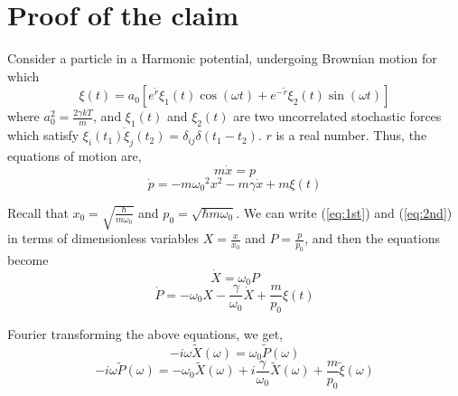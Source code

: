 \documentclass[12pt, twoside]{article}
\begin{document}
\section{Proof of the claim}
Consider a particle in a Harmonic potential, undergoing Brownian motion for which \begin{equation}\label{eq: stochastic}
	\xi(t) =  a_0 [e^{\tilde{r}} \xi_1(t) \cos(\omega t) + e^{-{\tilde{r}}} \xi_2(t)\sin(\omega t)]
\end{equation} where $a_0 ^ 2 = \frac{2 \gamma k T}{m}$, and $\xi_1(t)$ and $\xi_2(t)$ are two uncorrelated stochastic forces which satisfy $\overline{\xi_i(t_1)\xi_j(t_2)} = \delta_{ij}\delta(t_1 - t_2)$. $r$ is a real number. Thus, the equations of motion are, \begin{equation}\label{eq:1st}
m \dot{x} = p
\end{equation}
\begin{equation}\label{eq:2nd}
	\dot{p} = -m{\omega_0}^2 x^2 - m\gamma\dot{x} + m\xi(t)
\end{equation}

Recall that $x_0 =\sqrt{\frac{\hbar}{ m\omega_0}}$ and $p_0 = \sqrt{\hbar m \omega_0}$. We can write (\ref{eq:1st}) and (\ref{eq:2nd}) in terms of dimensionless variables $X = \frac{x}{x_0}$ and $P = \frac{p}{p_0}$, and then the equations become
\begin{equation}\label{eq:1}
	\dot{X} =\omega_0 P
\end{equation}
\begin{equation}\label{eq:2}
	\dot{P} = -\omega_0 X -\frac{\gamma}{\omega_0}\dot{X} + \frac{m}{p_0}\xi(t)
\end{equation}

Fourier transforming the above equations, we get, \begin{equation}\label{eq:1}
-i\omega\widetilde{X}(\omega) =\omega_0 \widetilde{P}(\omega)
\end{equation}
\begin{equation}\label{eq:2}
-i\omega\widetilde{P}(\omega) = -\omega_0 \widetilde{X}(\omega) +i\frac{\gamma}{\omega_0}\widetilde{X}(\omega) + \frac{m}{p_0}\widetilde{\xi}(\omega)
\end{equation}
\end{document}
